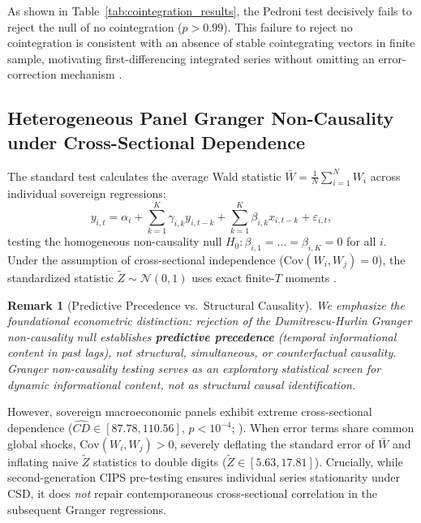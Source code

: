 \documentclass[11pt,a4paper]{article}
\newtheorem{remark}{Remark}
\begin{document}


As shown in Table~\ref{tab:cointegration_results}, the Pedroni test decisively fails to reject the null of no cointegration ($p > 0.99$). This failure to reject no cointegration is consistent with an absence of stable cointegrating vectors in finite sample, motivating first-differencing integrated series without omitting an error-correction mechanism \citep{westerlund2007}.


\subsection{Heterogeneous Panel Granger Non-Causality under Cross-Sectional Dependence}

The standard \citet{dumitrescu2012} test calculates the average Wald statistic $\bar{W} = \frac{1}{N}\sum_{i=1}^N W_i$ across individual sovereign regressions:
\begin{equation}
y_{i,t} = \alpha_i + \sum_{k=1}^K \gamma_{i,k} y_{i,t-k} + \sum_{k=1}^K \beta_{i,k} x_{i,t-k} + \varepsilon_{i,t},
\end{equation}
testing the homogeneous non-causality null $H_0: \beta_{i,1} = \dots = \beta_{i,K} = 0$ for all $i$. Under the assumption of cross-sectional independence ($\text{Cov}(W_i, W_j) = 0$), the standardized statistic $\tilde{Z} \sim \mathcal{N}(0, 1)$ uses exact finite-$T$ moments \citep{dumitrescu2012}.

\begin{remark}[Predictive Precedence vs.\ Structural Causality]
We emphasize the foundational econometric distinction: rejection of the Dumitrescu-Hurlin Granger non-causality null establishes \textbf{predictive precedence} (temporal informational content in past lags), not structural, simultaneous, or counterfactual causality. Granger non-causality testing serves as an exploratory statistical screen for dynamic informational content, not as structural causal identification.
\end{remark}

However, sovereign macroeconomic panels exhibit extreme cross-sectional dependence ($\hat{CD} \in [87.78, 110.56]$, $p < 10^{-4}$; \citealt{pesaran2021cd}). When error terms share common global shocks, $\text{Cov}(W_i, W_j) > 0$, severely deflating the standard error of $\bar{W}$ and inflating naive $\tilde{Z}$ statistics to double digits ($\tilde{Z} \in [5.63, 17.81]$). Crucially, while second-generation CIPS pre-testing ensures individual series stationarity under CSD, it does \emph{not} repair contemporaneous cross-sectional correlation in the subsequent Granger regressions.
\end{document}
